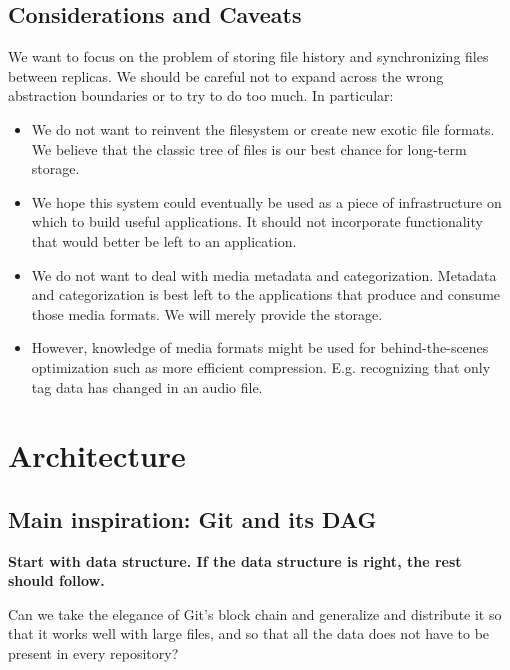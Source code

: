 \documentclass[a4paper]{article}
\begin{document}
\subsection{Considerations and Caveats}

We want to focus on the problem of storing file history and synchronizing files
between replicas.
We should be careful not to expand across the wrong abstraction boundaries or to
try to do too much.
In particular:

\begin{itemize}

  \item We do not want to reinvent the filesystem or create new exotic file
    formats.
    We believe that the classic tree of files is our best chance for long-term
    storage.

  \item We hope this system could eventually be used as a piece of
    infrastructure on which to build useful applications.
    It should not incorporate functionality that would better be left to an
    application.

  \item We do not want to deal with media metadata and categorization.
    Metadata and categorization is best left to the applications that produce
    and consume those media formats.
    We will merely provide the storage.

  \item However, knowledge of media formats might be used for behind-the-scenes
    optimization such as more efficient compression. E.g. recognizing that only
    tag data has changed in an audio file.

\end{itemize}


\section{Architecture}\label{architecture}

\subsection{Main inspiration: Git and its DAG}\label{main-inspiration-git}

\textbf{Start with data structure. If the data structure is right, the
rest should follow.}

Can we take the elegance of Git's block chain and generalize and
distribute it so that it works well with large files, and so that all
the data does not have to be present in every repository?
\end{document}
